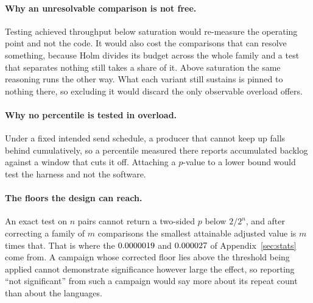 \documentclass[english,oneside,a4paper,censored,csm,software-track-2020]{HYthesisML}
\begin{document}
\begin{appendices}
\paragraph{Why an unresolvable comparison is not free.}
Testing achieved throughput below saturation would re-measure the operating point and not the
code. It would also cost the comparisons that can resolve something, because Holm divides its
budget across the whole family and a test that separates nothing still takes a share of it. Above
saturation the same reasoning runs the other way. What each variant still sustains is pinned to
nothing there, so excluding it would discard the only observable overload offers.

\paragraph{Why no percentile is tested in overload.}
Under a fixed intended send schedule, a producer that cannot keep up falls behind cumulatively, so
a percentile measured there reports accumulated backlog against a window that cuts it off.
Attaching a $p$-value to a lower bound would test the harness and not the software.

\paragraph{The floors the design can reach.}
An exact test on $n$ pairs cannot return a two-sided $p$ below $2/2^{n}$, and after correcting a
family of $m$ comparisons the smallest attainable adjusted value is $m$ times that. That is where
the $0.0000019$ and $0.000027$ of Appendix~\ref{sec:stats} come from. A campaign whose
corrected floor lies above the threshold being applied cannot demonstrate significance however
large the effect, so reporting ``not significant'' from such a campaign would say more about its
repeat count than about the languages.


\end{appendices}
\end{document}
